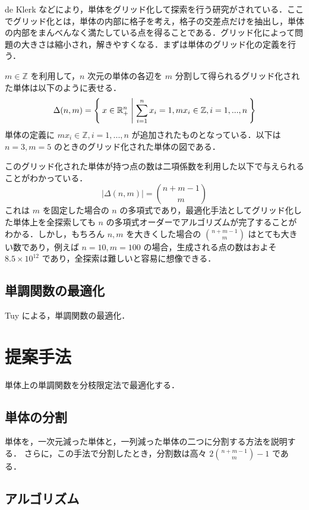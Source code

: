 \documentclass[a4paper,11pt]{jreport}
\begin{document}
de Klerk \cite{deklerk} などにより，単体をグリッド化して探索を行う研究がされている．ここでグリッド化とは，単体の内部に格子を考え，格子の交差点だけを抽出し，単体の内部をまんべんなく満たしている点を得ることである．グリッド化によって問題の大きさは縮小され，解きやすくなる．まずは単体のグリッド化の定義を行う．\par

$ m \in \mathbb{Z} $ を利用して，$ n $ 次元の単体の各辺を $ m $ 分割して得られるグリッド化された単体は以下のように表せる．
$$ \Delta(n, m) = \Set{ x \in \mathbb{R}^n_{+} | \sum_{i=1}^n x_i = 1, mx_i \in \mathbb{Z}, i = 1, ..., n } $$
単体の定義に $ mx_i \in \mathbb{Z}, i = 1, ..., n $ が追加されたものとなっている．以下は $ n = 3, m = 5 $ のときのグリッド化された単体の図である．

このグリッド化された単体が持つ点の数は二項係数を利用した以下で与えられることがわかっている．
$$ | \Delta(n, m) | = \binom{n + m - 1}{m} $$
これは $ m $ を固定した場合の $ n $ の多項式であり，最適化手法としてグリッド化した単体上を全探索しても $ n $ の多項式オーダーでアルゴリズムが完了することがわかる．しかし，もちろん $ n, m $ を大きくした場合の $ \binom{n + m - 1}{m} $ はとても大きい数であり，例えば $ n = 10, m = 100 $ の場合，生成される点の数はおよそ $ 8.5 \times 10^{12} $ であり，全探索は難しいと容易に想像できる．

\section{単調関数の最適化}

Tuy による，単調関数の最適化．

\chapter{提案手法}

単体上の単調関数を分枝限定法で最適化する．

\section{単体の分割}

単体を，一次元減った単体と，一列減った単体の二つに分割する方法を説明する．
さらに，この手法で分割したとき，分割数は高々 $ 2 \binom{n + m - 1}{m} - 1 $ である．

\section{アルゴリズム}
\end{document}
